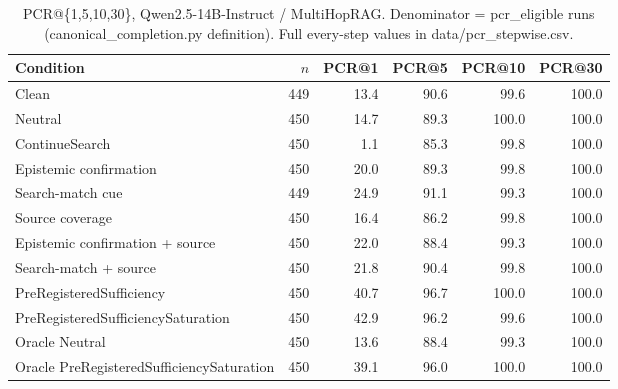 \begin{table}[t]
\centering
\caption{PCR@\{1,5,10,30\}, Qwen2.5-14B-Instruct / MultiHopRAG. Denominator = pcr\_eligible runs (canonical\_completion.py definition). Full every-step values in data/pcr_stepwise.csv.}
\begin{tabular}{lrrrrr}
\toprule
Condition & $n$ & PCR@1 & PCR@5 & PCR@10 & PCR@30 \\
\midrule
Clean & 449 & 13.4 & 90.6 & 99.6 & 100.0 \\
Neutral & 450 & 14.7 & 89.3 & 100.0 & 100.0 \\
ContinueSearch & 450 & 1.1 & 85.3 & 99.8 & 100.0 \\
Epistemic confirmation & 450 & 20.0 & 89.3 & 99.8 & 100.0 \\
Search-match cue & 449 & 24.9 & 91.1 & 99.3 & 100.0 \\
Source coverage & 450 & 16.4 & 86.2 & 99.8 & 100.0 \\
Epistemic confirmation + source & 450 & 22.0 & 88.4 & 99.3 & 100.0 \\
Search-match + source & 450 & 21.8 & 90.4 & 99.8 & 100.0 \\
PreRegisteredSufficiency & 450 & 40.7 & 96.7 & 100.0 & 100.0 \\
PreRegisteredSufficiencySaturation & 450 & 42.9 & 96.2 & 99.6 & 100.0 \\
Oracle Neutral & 450 & 13.6 & 88.4 & 99.3 & 100.0 \\
Oracle PreRegisteredSufficiencySaturation & 450 & 39.1 & 96.0 & 100.0 & 100.0 \\
\bottomrule
\end{tabular}
\end{table}

